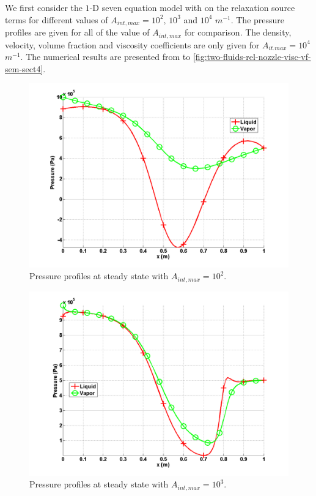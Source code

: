 We first consider the $1$-D seven equation model with on the relaxation source terms for different values of $A_{int,max} = 10^2 \text{, } 10^3$ and $10^4$ $m^{-1}$. The pressure profiles are given for all of the value of $A_{int,max}$ for comparison. The density, velocity, volume fraction and viscosity coefficients are only given for $A_{it.max} = 10^4$ $m^{-1}$. The numerical results are presented from  to \ref{fig:two-fluids-rel-nozzle-visc-vf-sem-sect4}.
%
\begin{figure}[H]
\centering
\includegraphics[width=\textwidth]{figures/SEM/Aint1e2_two_phases_pressure.png}
\caption{Pressure profiles at steady state with $A_{int,max} = 10^2$.}
\label{fig:two-fluids-rel-nozzle-press-Aint2-sem-sect4}
\end{figure}
%
\begin{figure}[H]
\centering
\includegraphics[width=\textwidth]{figures/SEM/Aint1e3_two_phases_pressure.png}
\caption{Pressure profiles at steady state with $A_{int,max} = 10^3$.}
\label{fig:two-fluids-rel-nozzle-press-Aint3-sem-sect4}
\end{figure}
